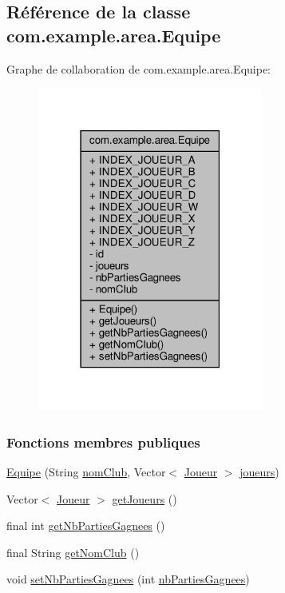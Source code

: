 \hypertarget{classcom_1_1example_1_1area_1_1_equipe}{}\subsection{Référence de la classe com.\+example.\+area.\+Equipe}
\label{classcom_1_1example_1_1area_1_1_equipe}


Graphe de collaboration de com.\+example.\+area.\+Equipe\+:
\nopagebreak
\begin{figure}[H]
\begin{center}
\leavevmode
\includegraphics[width=210pt]{classcom_1_1example_1_1area_1_1_equipe__coll__graph}
\end{center}
\end{figure}
\subsubsection*{Fonctions membres publiques}
\begin{DoxyCompactItemize}
\item 
\hyperlink{classcom_1_1example_1_1area_1_1_equipe_a313ec6933f3fb30f68ec93c7c290c6ee}{Equipe} (String \hyperlink{classcom_1_1example_1_1area_1_1_equipe_ac93205e041df88192dd6b1dfc8488e0a}{nom\+Club}, Vector$<$ \hyperlink{classcom_1_1example_1_1area_1_1_joueur}{Joueur} $>$ \hyperlink{classcom_1_1example_1_1area_1_1_equipe_a13f5e9288dec5f11829e1a7ccc21cdc9}{joueurs})
\item 
Vector$<$ \hyperlink{classcom_1_1example_1_1area_1_1_joueur}{Joueur} $>$ \hyperlink{classcom_1_1example_1_1area_1_1_equipe_aa681b4ea72d93a16fc8384fa3ccc8b21}{get\+Joueurs} ()
\item 
final int \hyperlink{classcom_1_1example_1_1area_1_1_equipe_a1ba6f14b9b168e283d5d6417ad0a5ed2}{get\+Nb\+Parties\+Gagnees} ()
\item 
final String \hyperlink{classcom_1_1example_1_1area_1_1_equipe_a735e5e0aaac9ac2c17f3eca3d47862dc}{get\+Nom\+Club} ()
\item 
void \hyperlink{classcom_1_1example_1_1area_1_1_equipe_aba16e2f2a922d1b2c4219dc6c865482c}{set\+Nb\+Parties\+Gagnees} (int \hyperlink{classcom_1_1example_1_1area_1_1_equipe_af01e154be3aaa3fbcf909c3a44734b2e}{nb\+Parties\+Gagnees})
\end{DoxyCompactItemize}
